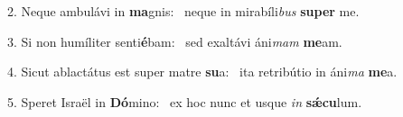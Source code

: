 2. Neque ambulávi in \textbf{ma}gnis: \ast\  neque in mirabíli\textit{bus} \textbf{su}\textbf{per} me.\

3. Si non humíliter senti\textbf{é}bam: \ast\  sed exaltávi áni\textit{mam} \textbf{me}am.\

4. Sicut ablactátus est super matre \textbf{su}a: \ast\  ita retribútio in áni\textit{ma} \textbf{me}a.\

5. Speret Israël in \textbf{Dó}mino: \ast\  ex hoc nunc et usque \textit{in} \textbf{sǽ}\textbf{cu}lum.\

